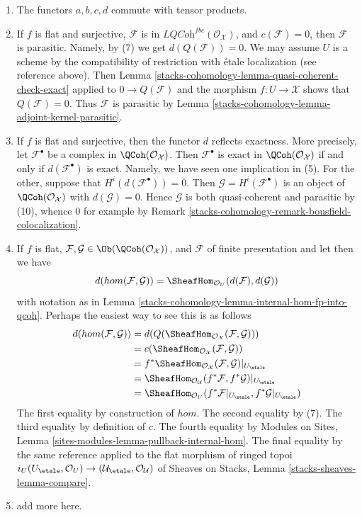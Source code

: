 \begin{enumerate}
$b$, $c$, $d$ by the references given above.
\item The functors $a, b, c, d$ commute with tensor products.
\item If $f$ is flat and surjective, $\mathcal{F}$ is in
$\textit{LQCoh}^{fbc}(\mathcal{O}_\mathcal{X})$, and $c(\mathcal{F}) = 0$,
then $\mathcal{F}$ is parasitic. Namely, by (7) we get $d(Q(\mathcal{F})) = 0$.
We may assume $U$ is a scheme by the compatibility of restriction
with \'etale localization (see reference above). Then
Lemma \ref{stacks-cohomology-lemma-quasi-coherent-check-exact} applied to $0 \to Q(\mathcal{F})$
and the morphism $f : U \to \mathcal{X}$ shows that $Q(\mathcal{F}) = 0$.
Thus $\mathcal{F}$ is parasitic by Lemma \ref{stacks-cohomology-lemma-adjoint-kernel-parasitic}.
\item If $f$ is flat and surjective, then the functor $d$
reflects exactness. More precisely, let $\mathcal{F}^\bullet$ be a complex in
$\QCoh(\mathcal{O}_\mathcal{X})$. Then $\mathcal{F}^\bullet$ is exact
in $\QCoh(\mathcal{O}_\mathcal{X})$ if and only if $d(\mathcal{F}^\bullet)$
is exact. Namely, we have seen one implication in (5). For the other,
suppose that $H^i(d(\mathcal{F}^\bullet)) = 0$. Then
$\mathcal{G} = H^i(\mathcal{F}^\bullet)$ is an object of
$\QCoh(\mathcal{O}_\mathcal{X})$ with $d(\mathcal{G}) = 0$.
Hence $\mathcal{G}$ is both quasi-coherent and parasitic by (10),
whence $0$ for example by Remark \ref{stacks-cohomology-remark-bousfield-colocalization}.
\item
\label{stacks-cohomology-item-hom-restriction}
If $f$ is flat,
$\mathcal{F}, \mathcal{G} \in \Ob(\QCoh(\mathcal{O}_\mathcal{X}))$,
and $\mathcal{F}$ of finite presentation and let
then we have
$$
d(hom(\mathcal{F}, \mathcal{G})) =
\SheafHom_{\mathcal{O}_U}(d(\mathcal{F}), d(\mathcal{G}))
$$
with notation as in Lemma \ref{stacks-cohomology-lemma-internal-hom-fp-into-qcoh}.
Perhaps the easiest way to see this is as follows
\begin{align*}
d(hom(\mathcal{F}, \mathcal{G}))
& =
d(Q(\SheafHom_{\mathcal{O}_\mathcal{X}}(\mathcal{F}, \mathcal{G}))) \\
& =
c(\SheafHom_{\mathcal{O}_\mathcal{X}}(\mathcal{F}, \mathcal{G})) \\
& =
f^*\SheafHom_{\mathcal{O}_\mathcal{X}}(\mathcal{F}, \mathcal{G})|_{U_\etale} \\
& =
\SheafHom_{\mathcal{O}_\mathcal{U}}(f^*\mathcal{F},
f^*\mathcal{G})|_{U_\etale} \\
& =
\SheafHom_{\mathcal{O}_U}(f^*\mathcal{F}|_{U_\etale},
f^*\mathcal{G}|_{U_\etale})
\end{align*}
The first equality by construction of $hom$. The second equality
by (7). The third equality by definition of $c$. The fourth equality
by Modules on Sites, Lemma \ref{sites-modules-lemma-pullback-internal-hom}.
The final equality by the same reference applied to the flat morphism
of ringed topoi $i_U (U_\etale, \mathcal{O}_U) \to
(\mathcal{U}_\etale, \mathcal{O}_\mathcal{U})$ of
Sheaves on Stacks, Lemma \ref{stacks-sheaves-lemma-compare}.
\item add more here.
\end{enumerate}

